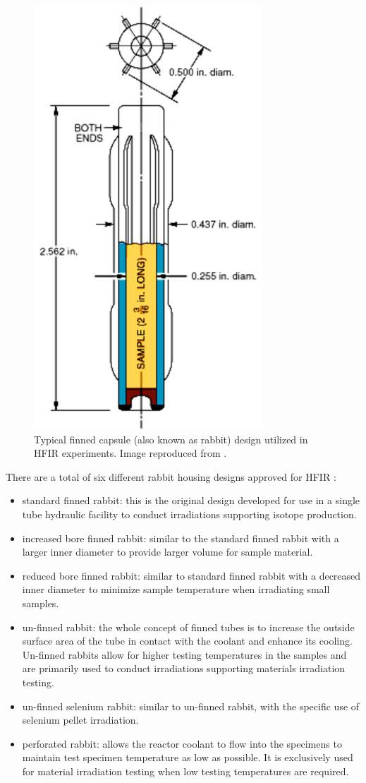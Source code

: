 \begin{figure}[htbp!] %
    \centering
    \includegraphics[width=0.45\linewidth]{figures/finned-rabbit}
    \hfill
    \caption{Typical finned capsule (also known as rabbit) design utilized in HFIR experiments. Image reproduced from \cite{hfir}.}
    \label{fig:hfir-rabbit}
\end{figure}

There are a total of six different rabbit housing designs approved for HFIR \cite{hfir}:
\begin{itemize}
  \item standard finned rabbit: this is the original design developed for use in a single tube hydraulic facility to conduct irradiations supporting isotope production.
  \item increased bore finned rabbit: similar to the standard finned rabbit with a larger inner diameter to provide larger volume for sample material.
  \item reduced bore finned rabbit: similar to standard finned rabbit with a decreased inner diameter to minimize sample temperature when irradiating small samples.
  \item un-finned rabbit: the whole concept of finned tubes is to increase the outside surface area of the tube in contact with the coolant and enhance its cooling. Un-finned rabbits allow for higher testing temperatures in the samples and are primarily used to conduct irradiations supporting materials irradiation testing.
  \item un-finned selenium rabbit: similar to un-finned rabbit, with the specific use of selenium pellet irradiation.
  \item perforated rabbit: allows the reactor coolant to flow into the specimens to maintain test specimen temperature as low as possible. It is exclusively used for material irradiation testing when low testing temperatures are required.
\end{itemize}

